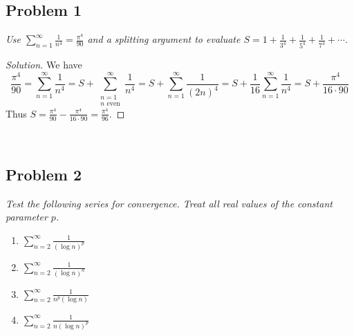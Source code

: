 \documentclass{article}
\begin{document}
\subsection*{Problem 1}
{\it Use $\sum_{n=1}^\infty \frac{1}{n^4} = \frac{\pi^4}{90}$ and
a splitting argument to evaluate
$S = 1 + \frac{1}{3^4} + \frac{1}{5^4} + \frac{1}{7^4} + \cdots.$}

\begin{proof}[Solution]\let\qed\relax
	We have
	\[
		\frac{\pi^4}{90}
		= \sum_{n=1}^\infty \frac{1}{n^4}
		= S + \sum_{\substack{n=1\\n\text{ even}}}^\infty \frac{1}{n^4}
		= S + \sum_{n=1}^\infty \frac{1}{(2n)^4}
		= S + \frac{1}{16}\sum_{n=1}^\infty\frac{1}{n^4}
		= S + \frac{\pi^4}{16\cdot90}
	\]
	Thus $S = \frac{\pi^4}{90} - \frac{\pi^4}{16\cdot90} = \frac{\pi^4}{96}$.
\end{proof}
\clearpage
~\clearpage

\subsection*{Problem 2}
{\it Test the following series for convergence.
Treat all real values of the constant parameter $p$.
\begin{enumerate}
	\item $\sum_{n=2}^\infty \frac{1}{(\log{n})^p}$
	\item $\sum_{n=2}^\infty \frac{1}{(\log{n})^n}$
	\item $\sum_{n=2}^\infty \frac{1}{n^p(\log{n})}$
	\item $\sum_{n=2}^\infty \frac{1}{n(\log{n})^p}$
\end{enumerate}}
\end{document}
